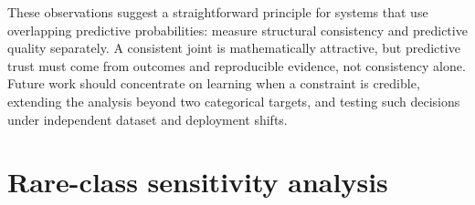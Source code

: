 \documentclass[a4paper,fleqn]{cas-sc}
\begin{document}
These observations suggest a straightforward principle for systems that use overlapping predictive probabilities: measure structural consistency and predictive quality separately. A consistent joint is mathematically attractive, but predictive trust must come from outcomes and reproducible evidence, not consistency alone. Future work should concentrate on learning when a constraint is credible, extending the analysis beyond two categorical targets, and testing such decisions under independent dataset and deployment shifts.

\appendix
\section{Rare-class sensitivity analysis}
\begin{table}
\centering
\caption{Rare-class exclusion sensitivity at the 256-row cap. Positive effects mean Selective CoRe is worse than arithmetic pooling.}
\end{table}
\end{document}
